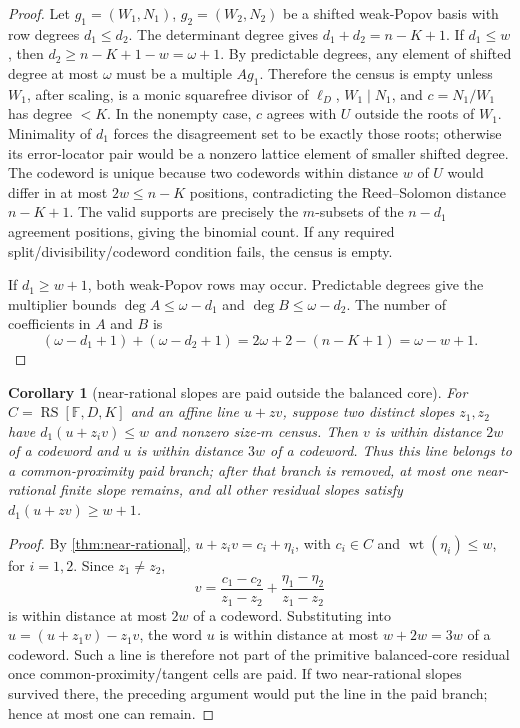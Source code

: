 \documentclass[a4paper,11pt]{amsart}
\newtheorem{corollary}[corollary]{Corollary}
\theoremstyle{remark}
\newcommand{\F}{\mathbb F}
\newcommand{\RS}{\operatorname{RS}}
\begin{document}
\begin{proof}
Let \(g_1=(W_1,N_1)\), \(g_2=(W_2,N_2)\) be a shifted weak-Popov basis with row degrees \(d_1\le d_2\).  The determinant degree gives \(d_1+d_2=n-K+1\).  If \(d_1\le w\), then \(d_2\ge n-K+1-w=\omega+1\).  By predictable degrees, any element of shifted degree at most \(\omega\) must be a multiple \(Ag_1\).  Therefore the census is empty unless \(W_1\), after scaling, is a monic squarefree divisor of \(\ell_D\), \(W_1\mid N_1\), and \(c=N_1/W_1\) has degree \(<K\).  In the nonempty case, \(c\) agrees with \(U\) outside the roots of \(W_1\).  Minimality of \(d_1\) forces the disagreement set to be exactly those roots; otherwise its error-locator pair would be a nonzero lattice element of smaller shifted degree.  The codeword is unique because two codewords within distance \(w\) of \(U\) would differ in at most \(2w\le n-K\) positions, contradicting the Reed--Solomon distance \(n-K+1\).  The valid supports are precisely the \(m\)-subsets of the \(n-d_1\) agreement positions, giving the binomial count.  If any required split/divisibility/codeword condition fails, the census is empty.

If \(d_1\ge w+1\), both weak-Popov rows may occur.  Predictable degrees give the multiplier bounds \(\deg A\le\omega-d_1\) and \(\deg B\le\omega-d_2\).  The number of coefficients in \(A\) and \(B\) is
\[
        (\omega-d_1+1)+(\omega-d_2+1)
        =2\omega+2-(n-K+1)=\omega-w+1.
\]
\end{proof}

\begin{corollary}[near-rational slopes are paid outside the balanced core]\label{cor:near-rational-line}
For \(C=\RS[\F,D,K]\) and an affine line \(u+zv\), suppose two distinct slopes \(z_1,z_2\) have \(d_1(u+z_iv)\le w\) and nonzero size-\(m\) census.  Then \(v\) is within distance \(2w\) of a codeword and \(u\) is within distance \(3w\) of a codeword.  Thus this line belongs to a common-proximity paid branch; after that branch is removed, at most one near-rational finite slope remains, and all other residual slopes satisfy \(d_1(u+zv)\ge w+1\).
\end{corollary}

\begin{proof}
By \cref{thm:near-rational}, \(u+z_i v=c_i+\eta_i\), with \(c_i\in C\) and \(\operatorname{wt}(\eta_i)\le w\), for \(i=1,2\).  Since \(z_1\ne z_2\),
\[
        v=\frac{c_1-c_2}{z_1-z_2}+\frac{\eta_1-\eta_2}{z_1-z_2}
\]
is within distance at most \(2w\) of a codeword.  Substituting into \(u=(u+z_1v)-z_1v\), the word \(u\) is within distance at most \(w+2w=3w\) of a codeword.  Such a line is therefore not part of the primitive balanced-core residual once common-proximity/tangent cells are paid.  If two near-rational slopes survived there, the preceding argument would put the line in the paid branch; hence at most one can remain.
\end{proof}
\end{document}
